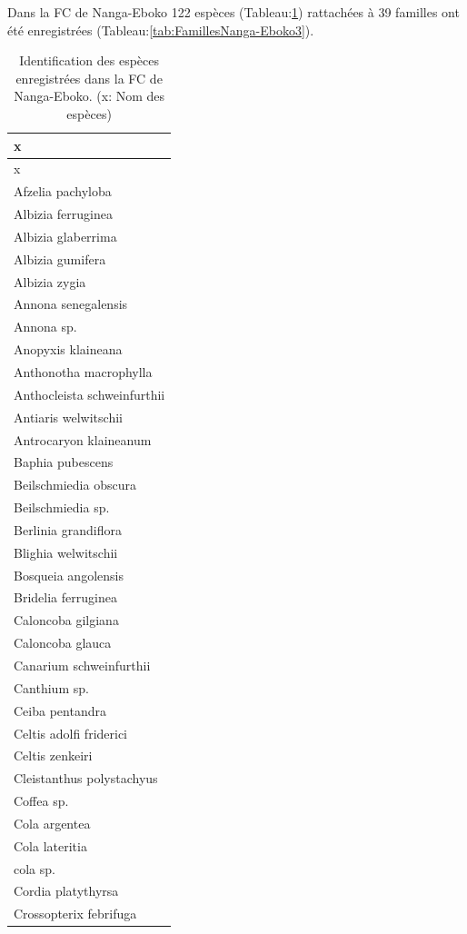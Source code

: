\documentclass[
  12pt,
  a4paper,
  extrafontsizes,
  onecolumn,
  openright]{book}
\theoremstyle{definition}
\theoremstyle{definition}
\theoremstyle{definition}
\theoremstyle{definition}
\theoremstyle{remark}
\begin{document}
Dans la FC de Nanga-Eboko 122 espèces (Tableau:\ref{tab:EspecesNanga-Eboko3}) rattachées à 39 familles ont été enregistrées (Tableau:\ref{tab:FamillesNanga-Eboko3}).

\begin{longtable}[]{@{}l@{}}
\caption{\label{tab:EspecesNanga-Eboko3}Identification des espèces enregistrées dans la FC de Nanga-Eboko. (x: Nom des espèces)}\tabularnewline
\toprule()
x \\
\midrule()
\endfirsthead
\toprule()
x \\
\midrule()
\endhead
Afzelia pachyloba \\
Albizia ferruginea \\
Albizia glaberrima \\
Albizia gumifera \\
Albizia zygia \\
Annona senegalensis \\
Annona sp. \\
Anopyxis klaineana \\
Anthonotha macrophylla \\
Anthocleista schweinfurthii \\
Antiaris welwitschii \\
Antrocaryon klaineanum \\
Baphia pubescens \\
Beilschmiedia obscura \\
Beilschmiedia sp. \\
Berlinia grandiflora \\
Blighia welwitschii \\
Bosqueia angolensis \\
Bridelia ferruginea \\
Caloncoba gilgiana \\
Caloncoba glauca \\
Canarium schweinfurthii \\
Canthium sp. \\
Ceiba pentandra \\
Celtis adolfi friderici \\
Celtis zenkeiri \\
Cleistanthus polystachyus \\
Coffea sp. \\
Cola argentea \\
Cola lateritia \\
cola sp. \\
Cordia platythyrsa \\
Crossopterix febrifuga \\

\end{longtable}
\end{document}
